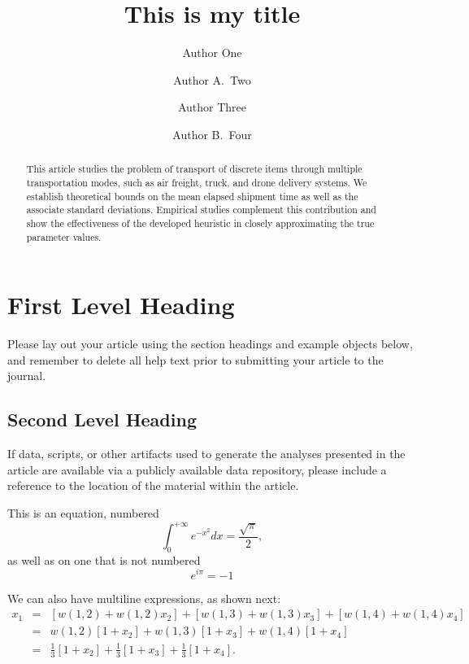 \documentclass[num-refs]{wiley-networks}
\title{This is my title}
\author[1\authfn{1}]{Author One}
\author[2\authfn{1}]{Author A.~Two}
\author[2\authfn{2}]{Author Three}
\author[2]{Author B.~Four}
\affil[1]{Department, Institution, City, State or Province, Postal Code, Country}
\affil[2]{Department, Institution, City, State or Province, Postal Code, Country}
\begin{document}
\maketitle

\begin{abstract}
This article studies the problem of transport of discrete items through multiple transportation modes, such as air freight, truck, and drone delivery systems. We establish theoretical bounds on the mean elapsed shipment time as well as the associate standard deviations. Empirical studies complement this contribution and show the effectiveness of the developed heuristic in closely approximating the true parameter values.


\end{abstract}

\section{First Level Heading}
Please lay out your article using the section headings and example objects below, and remember to delete all help text prior to submitting your article to the journal.



\subsection{Second Level Heading}
If data, scripts, or other artifacts used to generate the analyses presented in the article are available via a publicly available data repository, please include a reference to the location of the material within the article.

This is an equation, numbered
\begin{equation}
\int_0^{+\infty}e^{-x^2}dx=\frac{\sqrt{\pi}}{2},
\end{equation}
as well as on one that is not numbered
\begin{equation*}
e^{i\pi}=-1
\end{equation*}

We can also have multiline expressions, as shown next:
\begin{eqnarray*}
x_1&= & [w(1,2) + w(1,2) x_2] + [w(1,3) + w(1,3) x_3] + [w(1,4) + w(1,4) x_4] \\
      &= & w(1,2) [1+ x_2] + w(1,3)[1 + x_3] + w(1,4)[1  +  x_4] \\
      &= & \tfrac{1}{3} [1+ x_2] + \tfrac{1}{3}[1 + x_3] + \tfrac{1}{3}[1  +  x_4] .
\end{eqnarray*}
\end{document}
